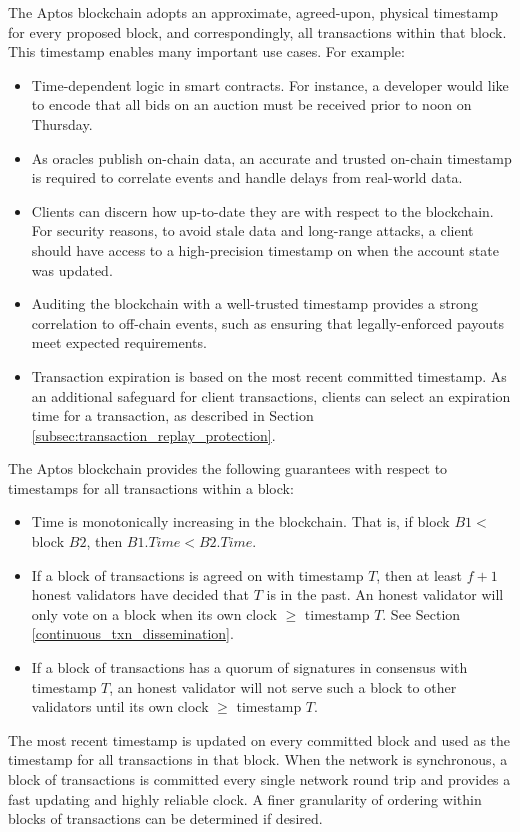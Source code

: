 \documentclass{article}
\begin{document}
The Aptos blockchain adopts an approximate, agreed-upon, physical timestamp for every proposed block, and correspondingly, all transactions within that block. This timestamp enables many important use cases. For example:
\begin{itemize}
\item Time-dependent logic in smart contracts. For instance, a developer would like to encode that all bids on an auction must be received prior to noon on Thursday.
\item As oracles publish on-chain data, an accurate and trusted on-chain timestamp is required to correlate events and handle delays from real-world data.
\item Clients can discern how up-to-date they are with respect to the blockchain. For security reasons, to avoid stale data and long-range attacks, a client should have access to a high-precision timestamp on when the account state was updated.
\item Auditing the blockchain with a well-trusted timestamp provides a strong correlation to off-chain events, such as ensuring that legally-enforced payouts meet expected requirements. 
\item Transaction expiration is based on the most recent committed timestamp. As an additional safeguard for client transactions, clients can select an expiration time for a transaction, as described in Section \ref{subsec:transaction_replay_protection}.
\end{itemize}
The Aptos blockchain provides the following guarantees with respect to timestamps for all transactions within a block:
\begin{itemize}
\item Time is monotonically increasing in the blockchain. That is, if block $B1 < $ block $B2$, then $B1.Time < B2.Time$.
\item If a block of transactions is agreed on with timestamp $T$, then at least $f+1$ honest validators have decided that $T$ is in the past. An honest validator will only vote on a block when its own clock $\ge$ timestamp $T$. See Section \ref{continuous_txn_dissemination}.
\item If a block of transactions has a quorum of signatures in consensus with timestamp $T$, an honest validator will not serve such a block to other validators until its own clock $\ge$ timestamp $T$.
\end{itemize}
The most recent timestamp is updated on every committed block and used as the timestamp for all transactions in that block. When the network is synchronous, a block of transactions is committed every single network round trip and provides a fast updating and highly reliable clock.  A finer granularity of ordering within blocks of transactions can be determined if desired.
\end{document}
